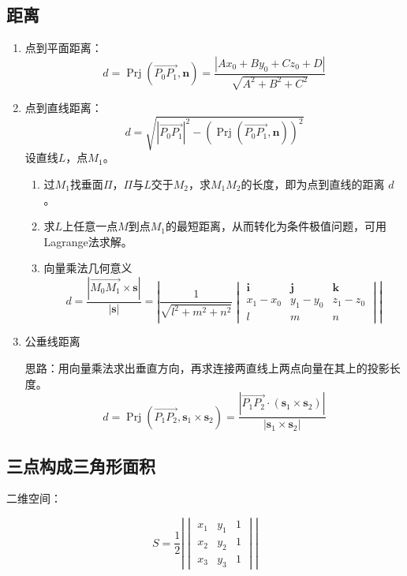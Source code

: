 \documentclass[UTF8,fontset=fandol,zihao=5]{ctexart}
\newcommand{\Prj}{\operatorname{Prj}}
\newcommand{\vect}[1]{\bm{#1}}
\begin{document}
\subsection{距离}
\begin{enumerate}

  \item 点到平面距离：
\[
d=\Prj(\overrightarrow{P_0P_1},\bm n)
=\frac{|Ax_0+By_0+Cz_0+D|}{\sqrt{A^2+B^2+C^2}}
\]

  
  \item 点到直线距离：
\[
d=\sqrt{\left|\overrightarrow{P_0P_1}\right|^2-
\left(\Prj(\overrightarrow{P_0P_1},\bm n)\right)^2}
\]
  设直线$L$，点$M_1$。

  \begin{enumerate}[label=(\arabic*)]
    \item 过$M_1$找垂面$\varPi$，$\varPi$与$L$交于$M_2$，求$M_1M_2$的长度，即为点到直线的距离 $d$。
  
    \item 求$L$上任意一点$M$到点$M_1$的最短距离，从而转化为条件极值问题，可用Lagrange法求解。
    
    \item 向量乘法几何意义
    \[
    d=\frac{\left|\overrightarrow{M_0M_1}\times\vect s\right|}{|\vect s|}
    =\left|
    \frac{1}{\sqrt{l^2+m^2+n^2}}
    \begin{vmatrix}
    \vect i & \vect j & \vect k \\
    x_1-x_0 & y_1-y_0 & z_1-z_0\\
    l & m & n
    \end{vmatrix}
    \right|
    \]
  \end{enumerate}

  \item 公垂线距离
  
  思路：用向量乘法求出垂直方向，再求连接两直线上两点向量在其上的投影长度。
  \[
  d
  =\Prj(\overrightarrow{P_1P_2},\vect s_1\times\vect s_2)
  =\frac{\left|\overrightarrow{P_1P_2}\cdot(\vect s_1\times\vect s_2)\right|}{|\vect s_1\times\vect s_2|}
  \]

\end{enumerate}

\subsection{三点构成三角形面积}

二维空间：

\[
S=
\frac{1}{2}
\left|\begin{vmatrix}
x_1 & y_1 & 1\\
x_2 & y_2 & 1\\
x_3 & y_3 & 1
\end{vmatrix}
\right|
\]
\end{document}
